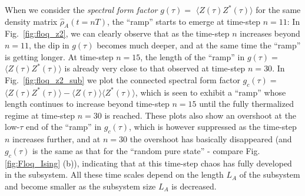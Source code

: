 \documentclass[aps,prb,preprint,onecolumn,amsmath,amssymb,superscriptaddress,eqsecnum,floatfix,scrartcl]{revtex4-1}
\begin{document}
When we consider the 
{\it spectral form factor}
$g(\tau)=$ 
 $\langle Z(\tau)Z^*(\tau)\rangle$
for  the same  density matrix ${\hat \rho}_A(t=n T)$,
 the ``ramp'' starts to emerge at time-step  $n=11$:
 In Fig.~\ref{fig:floq_z2}, we can clearly observe that as the time-step $n$ increases
beyond $n=11$,
the dip in $g(\tau)$  becomes much deeper,
and  at the same time
the  ``ramp'' is getting longer.
At time-step $n=15$, the length of the  ``ramp'' in 
$g(\tau)=$ $\langle Z(\tau)Z^*(\tau)\rangle$  is already very close to that observed at time-step $n=30$.
In Fig.~\ref{fig:floq_z2_sub} we plot   the connected
spectral form factor
$g_c(\tau)=$ 
$\langle Z(\tau)Z^*(\tau)\rangle-\langle Z(\tau)\rangle\langle Z^*(\tau)\rangle$, 
which is seen to exhibit a ``ramp'' whose length continues to increase 
beyond time-step $n=15$ until the fully thermalized regime at time-step $n=30$ is reached.
These plots also show an overshoot  at the low-$\tau$ end of the ``ramp'' in $g_c(\tau)$, which
 is however  suppressed as the time-step $n$ increases further, 
 and at $n=30$  the overshoot  has basically disappeared 
(and $g_c(\tau)$   is  the same as that for the  ``random pure state''
- compare  Fig. \ref{fig:Floq_Ising} (b)),
indicating that
at this time-step chaos has fully developed in the subsystem. All these time scales depend on the length $L_A$ of
the  subsystem and become smaller as the subsystem size $L_A$  is decreased. 
\end{document}
